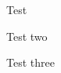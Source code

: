 \documentclass[monospace]{resume}
\begin{document}
\begin{education}
    \begin{description}
        \item Test
        \item Test two
    \end{description}

    \begin{description}
        \item Test three
    \end{description}
\end{education}
\end{document}
